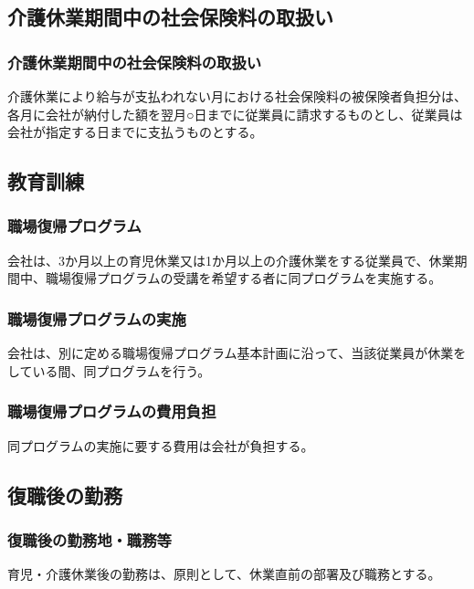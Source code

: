 \documentclass{jsarticle}
\begin{document}
\subsection{介護休業期間中の社会保険料の取扱い}
\label{育介_条_介護休業期間中の社会保険料の取扱い}

\subsubsection{介護休業期間中の社会保険料の取扱い}
\label{育介_項_介護休業期間中の社会保険料の取扱い}
介護休業により給与が支払われない月における社会保険料の被保険者負担分は、各月に会社が納付した額を翌月○日までに従業員に請求するものとし、従業員は会社が指定する日までに支払うものとする。

\subsection{教育訓練}
\label{育介_条_教育訓練}

\subsubsection{職場復帰プログラム}
\label{育介_項_職場復帰プログラム}
会社は、3か月以上の育児休業又は1か月以上の介護休業をする従業員で、休業期間中、職場復帰プログラムの受講を希望する者に同プログラムを実施する。

\subsubsection{職場復帰プログラムの実施}
\label{育介_項_職場復帰プログラムの実施}
会社は、別に定める職場復帰プログラム基本計画に沿って、当該従業員が休業をしている間、同プログラムを行う。

\subsubsection{職場復帰プログラムの費用負担}
\label{育介_項_職場復帰プログラムの費用負担}
同プログラムの実施に要する費用は会社が負担する。

\subsection{復職後の勤務}
\label{育介_条_復職後の勤務}

\subsubsection{復職後の勤務地・職務等}
\label{育介_項_復職後の勤務地・職務等}
育児・介護休業後の勤務は、原則として、休業直前の部署及び職務とする。
\end{document}
